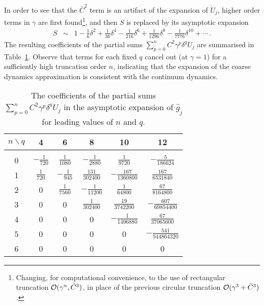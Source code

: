 \documentclass[12pt,a5paper]{article}
\begin{document}
In order to see that the $\bar{C}^2$ term is an artifact of the expansion of $\dot{U}_j$, 
higher order terms in $\gamma$ are first found\footnote{Changing, for computational convenience, to the use of rectangular truncation
${\cal O}(\gamma^n,\bar{C}^3)$, 
in place of the previous circular truncation ${\cal O}(\gamma^3+\bar{C}^3)$.}, and then $S$ is replaced by its asymptotic expansion
\begin{eqnarray}
S & \sim & 1-\frac{1}{6}\delta^2+\frac{1}{36}\delta^4-\frac{1}{216}\delta^6+\frac{1}{1296}\delta^8-\frac{1}{7776}\delta^{10}+\cdots\,.
\end{eqnarray}
The resulting coefficients of the partial sums $\sum_{p=0}^{n}C^2\gamma^p \delta^qU_j$ are summarised in Table~\ref{tab:terms}.
Observe that terms for each fixed $q$ cancel out (at $\gamma=1$) for a sufficiently high truncation order $n$,
indicating that the expansion of the coarse dynamics approximation is consistent with the continuum dynamics.
\begin{table}
\caption{The coefficients of the partial sums $\sum_{p=0}^{n}C^2\gamma^p\delta^q U_j$ in the 
asymptotic expansion of $\hat{g}_j$ for leading values of $n$ and $q$.}
\label{tab:terms}
\centering
\begin{tabular}{cccccc}
\hline
$n\backslash q$ & 4 & 6 & 8 & 10 & 12\\
\hline
&&&&&\\[-2ex]
0 & $-\frac{1}{720}$ & $\frac{1}{1080}$ & $-\frac{1}{2880}$        & $\frac{1}{9720}$            & $-\frac{5}{186624}$\\[1ex]
1 & $\frac{1}{720}$  & $-\frac{1}{945}$  & $\frac{131}{302400}$ & $-\frac{167}{1360800}$ & $\frac{167}{6531840}$\\[1ex]
2 & 0                          & $\frac{1}{7560}$  & $-\frac{1}{11200}$     & $\frac{1}{64800}$           & $\frac{67}{8164800}$\\[1ex]
3 & 0                          & 0                            & $\frac{1}{302400}$     & $\frac{19}{3742200}$     & $-\frac{607}{69854400}$\\[1ex]
4 & 0                          & 0                            & 0                                   & $-\frac{1}{1496880}$      & $\frac{67}{37065600}$\\[1ex]
5 & 0                          & 0                            & 0                                   & 0                                        & $-\frac{541}{544864320}$\\[1ex]
6 & 0                          & 0                            & 0                                   & 0                                        & 0\\[1ex]
\hline
\end{tabular}
\end{table}
\end{document}
